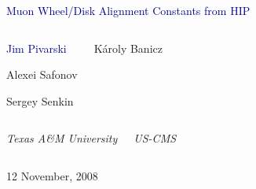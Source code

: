 \documentclass[compress]{beamer}
\begin{document}
\begin{frame}
\vfill
\begin{center}
\textcolor{darkblue}{\Large Muon Wheel/Disk Alignment Constants from HIP}

\vfill
\begin{columns}
\begin{center}
\large
\textcolor{darkblue}{Jim Pivarski}

\vspace{0.2 cm}
Alexei Safonov

\vspace{0.2 cm}
Sergey Senkin
\end{center}

\begin{center}
\large
K\'aroly Banicz
\end{center}
\end{columns}

\begin{columns}
\begin{center}
\scriptsize
{\it Texas A\&M University}
\end{center}
\begin{center}
\scriptsize
{\it US-CMS}
\end{center}
\end{columns}

\vfill
12 November, 2008

\end{center}
\end{frame}


\small
\end{document}
